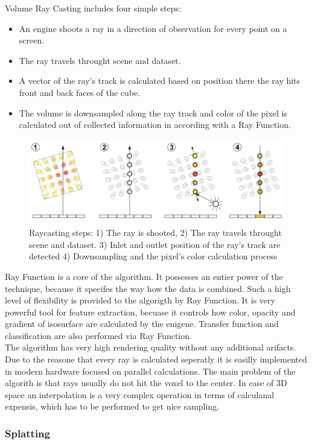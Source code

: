 \documentclass[twoside, english, 11pt]{report}
\begin{document}
Volume Ray Casting includes four simple steps:
\begin{itemize}
\item An engine shoots a ray in a direction of observation for every point on a screen.
\item The ray travels throught scene and dataset.
\item A vector of the ray's track is calculated based on position there the ray hits front and back faces of the cube.
\item The volume is downsampled along the ray track and color of the pixel is calculated out of collected information in according with a Ray Function.
\end{itemize}
\begin{figure}[H]
\centerline{\includegraphics[scale=0.35]{img/rayCast}}
\caption{Raycasting steps: 1) The ray is shooted, 2) The ray travels throught scene and dataset. 3) Inlet and outlet position of the ray's track are detected 4) Downsampling and the pixel's color calculation process}
\end{figure}

Ray Function is a core of the algorithm. It possesses an entier power of the technique, because it specifes the way how the data is combined. Such a high level of flexibility is provided to the algorigth by Ray Function. It is very powerful tool for feature extraction, becuase it controls how color, opacity and gradient of isosurface are calculated by the enigene. Transfer function and classification are also performed via Ray Function.\\

The algorithm has very high rendering quality without any additional arifacts. Due to the reasone that every ray is calculated seperatly it is easilly implemented in modern hardware focused on parallel calculations. The main problem of the algorith is that rays usually do not hit the voxel to the center. In case of 3D space an interpolation is a very complex operation in terms of calculanal expensis, which has to be performed to get nice sampling.
\subsubsection{Splatting}
\end{document}
